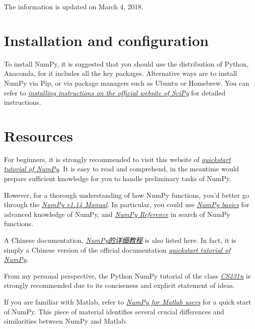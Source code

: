 \documentclass[english]{../TeXTemplate/pkupaper}
\title{\titlemark}
\author{Yixuan Wang\quad ppppass}
\date{March 4, 2018}
\begin{document}
\maketitle

The information is updated on March 4, 2018.

\section{Installation and configuration}

To install NumPy, it is suggested that you should use the distribution of Python, Anaconda, for it includes all the key packages. Alternative ways are to install NumPy via Pip, or via package managers such as Ubuntu or Homebrew. You can refer to \href{https://scipy.org/install.html}{\emph{installing instructions on the official website of SciPy}} for detailed instructions. 

\section{Resources}
For beginners, it is strongly recommended to visit this website of \href{https://docs.scipy.org/doc/numpy/user/quickstart.html}{\emph{quickstart tutorial of NumPy}}. It is easy to read and comprehend, in the meantime would prepare sufficient knowledge for you to handle preliminary tasks of NumPy.

However, for a thorough understanding of how NumPy functions, you'd better go through the \href{https://docs.scipy.org/doc/numpy/index.html}{\emph{NumPy v1.14 Manual}}. In particular, you could use \href{https://docs.scipy.org/doc/numpy/user/basics.html}{\emph{NumPy basics}} for advanced knowledge of NumPy, and \href{https://docs.scipy.org/doc/numpy/reference/index.html}{\emph{NumPy Reference}} in search of NumPy functions.

A Chinese documentation, \href{https://blog.csdn.net/chen_shiqiang/article/details/51868115}{\emph{NumPy的详细教程}} is also listed here. In fact, it is simply a Chinese version of the official documentation \href{https://docs.scipy.org/doc/numpy/user/quickstart.html}{\emph{quickstart tutorial of NumPy}}.

From my personal perspective, the Python NumPy tutorial of the class \href{https://cs231n.github.io/python-numpy-tutorial/}{\emph{CS231n}} is strongly recommended due to its conciseness and explicit statement of ideas.

If you are familiar with Matlab, refer to \href{https://docs.scipy.org/doc/numpy/user/numpy-for-matlab-users.html}{\emph{NumPy for Matlab users}} for a quick start of NumPy. This piece of material identifies several crucial differences and similarities between NumPy and Matlab.
\end{document}
